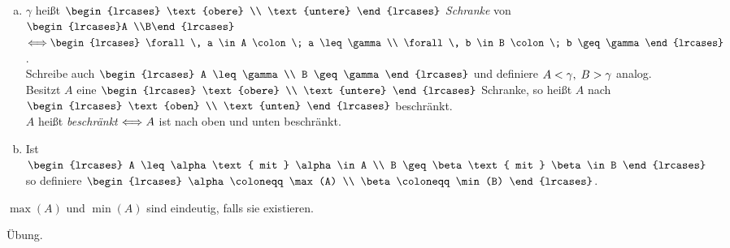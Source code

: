 \documentclass[../ana1.tex]{subfiles}
\begin{document}
\begin{defi*}\leavevmode
	\begin{enumerate}[(a)]
		\item \(\gamma \) heißt \(\begin{lrcases}
									\text{obere} \\
									\text{untere}
								 \end{lrcases} \) \textit{Schranke} von \(\begin{lrcases}A \\B\end{lrcases} \)
			  \(\longeq \begin{lrcases}
							\forall \, a \in A \colon \; a \leq \gamma \\
							\forall \, b \in B \colon \; b \geq \gamma  
						\end{lrcases} \). \\
			  Schreibe auch \(\begin{lrcases}
								 A \leq \gamma \\ 
								 B \geq \gamma 
							  \end{lrcases} \)
			  und definiere \(A < \gamma ,  \; B > \gamma \) analog. \\
			  Besitzt \(A \) eine \(\begin{lrcases}
									  \text{obere} \\
									  \text{untere}
								   \end{lrcases} \) Schranke,
			  so heißt \(A \) nach \(\begin{lrcases}
									  \text{oben} \\
									  \text{unten}
								   \end{lrcases} \) beschränkt. \\
			  \(A\) heißt \textit{beschränkt} \(\mathrel{\Longleftrightarrow} A \) ist nach oben und unten beschränkt.
		\item Ist \(\begin{lrcases}
						A \leq \alpha \text{ mit } \alpha \in A \\
						B \geq \beta \text{ mit } \beta \in B
					\end{lrcases} \) so definiere
			  \(\begin{lrcases}
					\alpha \coloneqq \max(A) \\
					\beta \coloneqq \min(B)
				\end{lrcases} \).
	\end{enumerate}
\end{defi*}

\begin{bem}
	\(\max(A) \) und \(\min(A) \) sind eindeutig, falls sie existieren.
\end{bem}
\begin{bew}
	Übung.\phantom{\qedhere}
\end{bew}
\end{document}
